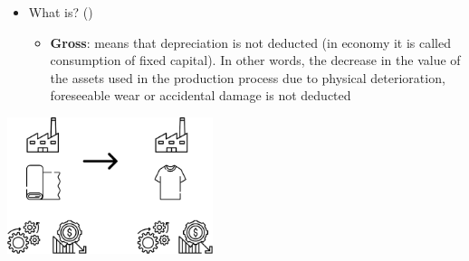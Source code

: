 \documentclass[
  ignorenonframetext,
]{beamer}
\providecommand{\tightlist}{%
  \setlength{\itemsep}{0pt}\setlength{\parskip}{0pt}}\usepackage{longtable,booktabs,array}
\begin{document}
\begin{frame}{}
\label{section-4}
\begin{itemize}
\item
  What is? ()

  \begin{itemize}
  \tightlist
  \item
    \textbf{Gross}: means that depreciation is not deducted (in economy
    it is called consumption of fixed capital). In other words, the
    decrease in the value of the assets used in the production process
    due to physical deterioration, foreseeable wear or accidental damage
    is not deducted
  \end{itemize}
\end{itemize}

\begin{center}
\includegraphics[width=0.45\textwidth,height=\textheight]{_000_images/001_image3.png}
\end{center}
\end{frame}
\end{document}
